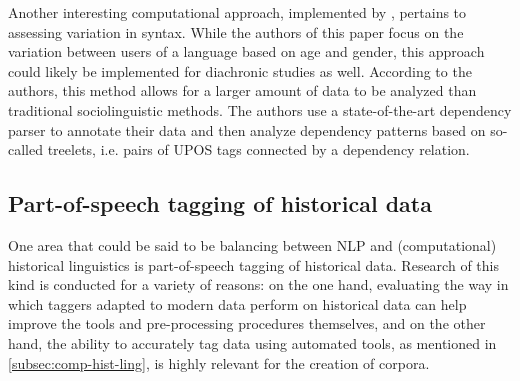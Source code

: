 Another interesting computational approach, implemented by \citet{johannsen-etal-2015-cross}, pertains to assessing variation in syntax. While the authors of this paper focus on the variation between users of a language based on age and gender, this approach could likely be implemented for diachronic studies as well. According to the authors, this method allows for a larger amount of data to be analyzed than traditional sociolinguistic methods. The authors use a state-of-the-art dependency parser to annotate their data and then analyze dependency patterns based on so-called treelets, i.e. pairs of UPOS tags connected by a dependency relation. 

\subsection{Part-of-speech tagging of historical data}
\label{subsec:historical-pos-tagging}

One area that could be said to be balancing between NLP and (computational) historical linguistics is part-of-speech tagging of historical data. Research of this kind is conducted for a variety of reasons: on the one hand, evaluating the way in which taggers adapted to modern data perform on historical data can help improve the tools and pre-processing procedures themselves, and on the other hand, the ability to accurately tag data using automated tools, as mentioned in \autoref{subsec:comp-hist-ling}, is highly relevant for the creation of corpora. 

